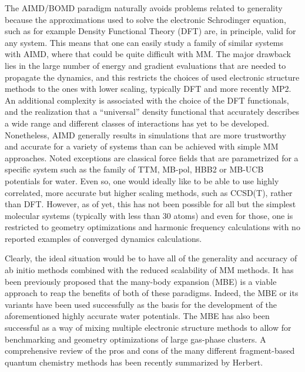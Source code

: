 \documentclass[11pt, proquest]{uwthesis}[2020/02/24]
\begin{document}
\par The AIMD/BOMD paradigm naturally avoids problems related to generality because the approximations used to solve the electronic Schrodinger equation, such as for example Density Functional Theory (DFT) are, in principle, valid for any system. This means that one can easily study a family of similar systems with AIMD, where that could be quite difficult with MM. The major drawback lies in the large number of energy and gradient evaluations that are needed to propagate the dynamics, and this restricts the choices of used electronic structure methods to the ones with lower scaling, typically DFT and more recently MP2.\autocite{kuhne_cp2k_2020} An additional complexity is associated with the choice of the DFT functionals\autocite{perdew_density_2001}, and the realization that a “universal” density functional that accurately describes a wide range and different classes of interactions has yet to be developed. Nonetheless, AIMD generally results in simulations that are more trustworthy and accurate for a variety of systems than can be achieved with simple MM approaches. Noted exceptions are classical force fields that are parametrized for a specific system such as the family of TTM, MB-pol, HBB2 or MB-UCB potentials for water.\autocite{babin_development_2013,babin_development_2014,medders_development_2014,das_development_2019,fanourgakis_bend_2006,fanourgakis_development_2008,burnham_development_2002} Even so, one would ideally like to be able to use highly correlated, more accurate but higher scaling methods, such as CCSD(T), rather than DFT. However, as of yet, this has not been possible for all but the simplest molecular systems (typically with less than 30 atoms) and even for those, one is restricted to geometry optimizations and harmonic frequency calculations with no reported examples of converged dynamics calculations.

\par Clearly, the ideal situation would be to have all of the generality and accuracy of ab initio methods combined with the reduced scalability of MM methods. It has been previously proposed\autocite{herbert_fantasy_2019} that the many-body expansion (MBE) is a viable approach to reap the benefits of both of these paradigms. Indeed, the MBE or its variants have been used successfully as the basis for the development of the aforementioned highly accurate water potentials.\autocite{babin_development_2013,babin_development_2014,medders_development_2014,das_development_2019,fanourgakis_bend_2006,fanourgakis_development_2008,burnham_development_2002} The MBE has also been successful as a way of mixing multiple electronic structure methods to allow for benchmarking and geometry optimizations of large gas-phase clusters.\autocite{bates_development_2011,bates_efficient_2011,howard_n-body_2013} A comprehensive review of the pros and cons of the many different fragment-based quantum chemistry methods has been recently summarized by Herbert.\autocite{herbert_fantasy_2019}
\end{document}
